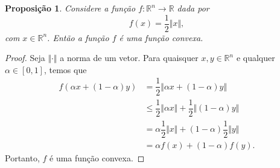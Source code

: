 \documentclass[12pt,a4paper]{scrartcl}
\def\RR{\mathds{R}}
\newtheorem{prop}{Proposição}
\theoremstyle{definition}%
\begin{document}
\begin{prop} \label{prop:norma_funcao_convexa}
Considere a função $f: \RR^{n} \rightarrow \RR$ dada por
\[
f(x) = \dfrac{1}{2}\Vert x \Vert,
\]
com $x\in \RR^{n}$. Então a função $f$ é uma função convexa.
\end{prop}
\begin{proof}
Seja $\Vert \cdot \Vert$ a norma de um vetor. Para quaisquer $x, y \in \RR^{n}$ e qualquer $\alpha \in [0,1]$, temos que
\begin{align}
f(\alpha x + (1-\alpha)y) &= \dfrac{1}{2} \Vert \alpha x + (1-\alpha)y \Vert \\
&\leq \dfrac{1}{2} \Vert \alpha x\Vert + \dfrac{1}{2}\Vert (1-\alpha)y \Vert \\
&= \alpha \dfrac{1}{2} \Vert x \Vert + (1-\alpha)\dfrac{1}{2} \Vert y \Vert \\
&= \alpha f(x) + (1-\alpha)f(y).
\end{align}
Portanto, $f$ é uma função convexa.
\end{proof}

\newpage

\printbibliography
\end{document}
